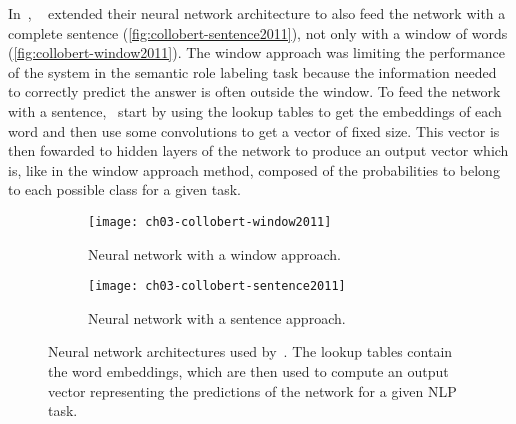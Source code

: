       In~\citeyear{collobert2011natural},
      \citeauthor{collobert2011natural}~\citep{collobert2011natural} extended
      their neural network architecture to also feed the network with a complete
      sentence (\autoref{fig:collobert-sentence2011}), not only with a window of
      words (\autoref{fig:collobert-window2011}). The window approach was
      limiting the performance of the system in the semantic role labeling task
      because the information needed to correctly predict the answer is often
      outside the window. To feed the network with a
      sentence,~\citeauthor{collobert2011natural} start by using the lookup
      tables to get the embeddings of each word and then use some convolutions
      to get a vector of fixed size. This vector is then fowarded to hidden
      layers of the network to produce an output vector which is, like in the
      window approach method, composed of the probabilities to belong to each
      possible class for a given task.

      \begin{figure}[hb]
        \centering
        \begin{subfigure}[t]{0.49\textwidth}
          \centering
          \texttt{[image: ch03-collobert-window2011]}
          \caption{Neural network with a window approach.}
          \label{fig:collobert-window2011}
        \end{subfigure} \hfill
        \begin{subfigure}[t]{0.49\textwidth}
          \centering
          \texttt{[image: ch03-collobert-sentence2011]}
          \caption{Neural network with a sentence approach.}
          \label{fig:collobert-sentence2011}
        \end{subfigure}
        \caption[Window and sentence approach networks used
        by~\citeauthor{collobert2011natural}]{Neural network architectures used
        by~\citep{collobert2011natural}. The lookup tables contain the word
        embeddings, which are then used to compute an output vector representing
        the predictions of the network for a given NLP task.}
        \label{ch03:fig:collobert2011}
      \end{figure}

